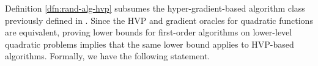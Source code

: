 \documentclass{article}
\begin{document}

Definition \ref{dfn:rand-alg-hvp} subsumes the hyper-gradient-based algorithm class previously defined in \citep[Definition 2]{ji2023lower}.
Since the HVP and gradient oracles for quadratic functions are equivalent, proving lower bounds for first-order algorithms on lower-level quadratic problems implies that the same lower bound applies to HVP-based algorithms. Formally, we have the following statement.


\end{document}
